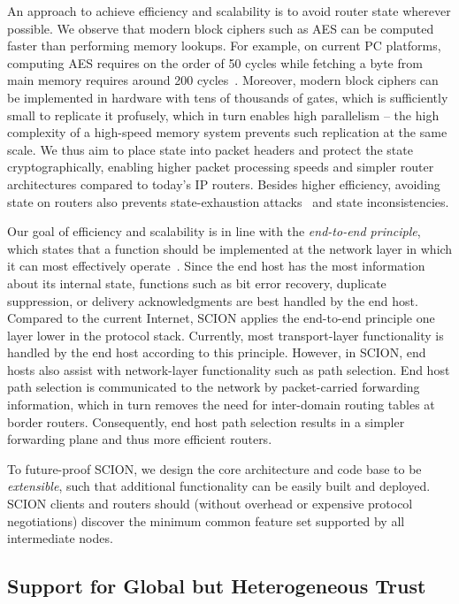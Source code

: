 \documentclass[a4paper]{llncs}
\newcommand\SCION{{\small\textsf{SCION}}\xspace}
\begin{document}
An approach to achieve efficiency and scalability is to
avoid router state wherever possible. We observe that modern
block ciphers such as AES can be computed faster than
performing memory lookups. For example, on current PC platforms,
computing AES requires on the order of 50 cycles while fetching a byte
from main memory requires around 200 cycles~\cite{intelaesniwhitepaper}. 
Moreover, modern block ciphers can
be implemented in hardware with tens of thousands of gates, which is
sufficiently small to replicate it profusely, which in turn enables high
parallelism -- the high complexity of a high-speed memory system prevents such
replication at the same scale.
We thus aim to
place state into packet headers and protect the state cryptographically,
enabling higher packet processing speeds 
and simpler router architectures compared to today's IP routers.
Besides higher efficiency, avoiding state on routers also prevents
state-exhaustion attacks~\cite{SVMFHK2011} and state inconsistencies.

Our goal of efficiency and scalability is in line with the \emph{end-to-end
  principle}, which states that a function should be implemented at the network layer
in which it can most effectively operate~\cite{SalReeCla84}. Since the end host
has the most information about its internal state, functions such as bit error
recovery, duplicate suppression, or delivery acknowledgments are best handled
by the end host. Compared to the current Internet, \SCION applies the end-to-end
principle one layer lower in the protocol stack. Currently, most
transport-layer functionality is handled by the end host according to this
principle. However, in \SCION, end hosts also assist with network-layer
functionality such as path selection. End host path selection is communicated to
the network by packet-carried forwarding information, which in turn removes the
need for inter-domain routing tables at border routers. Consequently, end
host path selection results in a simpler forwarding plane and thus more
efficient routers.

To future-proof \SCION, we design the core architecture and code base to be
\emph{extensible}, such that additional functionality can be easily built and
deployed. \SCION clients and routers should (without overhead or expensive
protocol negotiations) discover the minimum common feature set supported by all
intermediate nodes.



\subsection{Support for Global but Heterogeneous Trust}
\end{document}
